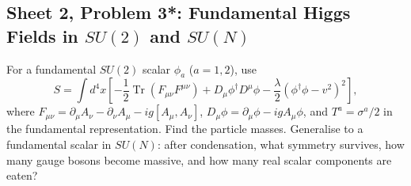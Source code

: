 \subsection{Sheet 2, Problem 3*: Fundamental Higgs Fields in $SU(2)$ and $SU(N)$}

For a fundamental $SU(2)$ scalar $\phi_a$ ($a=1,2$), use
\begin{equation}
    S=\int d^4x\left[-\frac12\operatorname{Tr}(F_{\mu\nu}F^{\mu\nu})
    +D_\mu\phi^\dagger D^\mu\phi
    -\frac\lambda2(\phi^\dagger\phi-v^2)^2\right],
\end{equation}
where $F_{\mu\nu}=\partial_\mu A_\nu-\partial_\nu A_\mu
-ig[A_\mu,A_\nu]$, $D_\mu\phi=\partial_\mu\phi-igA_\mu\phi$,
and $T^a=\sigma^a/2$ in the fundamental representation.
Find the particle masses. Generalise to a fundamental scalar in
$SU(N)$: after condensation, what symmetry survives, how many gauge
bosons become massive, and how many real scalar components are eaten?
